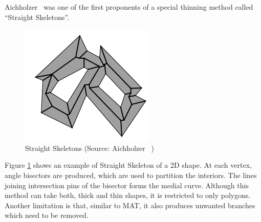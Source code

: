 Aichholzer~\cite{Aichholzer1991, Aichholzer2006} was one of the first proponents of a special thinning method called ``Straight Skeletons''. 


	\begin{figure} [!h]
		\centering
		\includegraphics[width=0.4\linewidth]{images/Straight}
		\caption{Straight Skeletons (Source: Aichholzer~\cite{Aichholzer1991} )}
		\label{fig:litsurvey:straight}
	\end{figure}
	

Figure \ref{fig:litsurvey:straight} shows an example of Straight Skeleton of a 2D shape. At each vertex, angle bisectors are produced, which are used to partition the interiors. The lines joining intersection pins of the bisector forms the medial curve. Although this method can take both, thick and thin shapes, it is restricted to only polygons. Another limitation is that, similar to MAT, it also produces unwanted branches which need to be removed.


